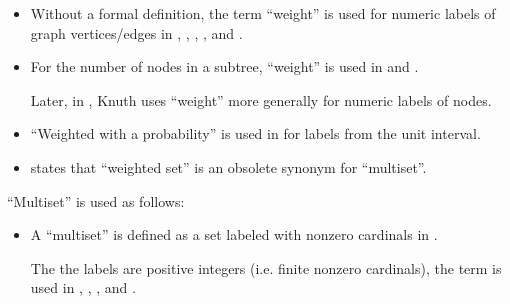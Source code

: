 \begin{remark}
\begin{thmenum}
\begin{itemize}
\begin{itemize}
        \item \( R \) is taken to be a \hyperref[def:ring/commutative]{commutative ring in}
        \cite[500]{Stanley2012EnumerativeCombinatoricsVol1}.

        \item \( R \) is taken to be an additively-idempotent \hyperref[def:semiring]{semiring} in
        \cite[def. 5.13]{БелоусовТкачёв2004ДискретнаяМатематика}.

        \item \( R \) is taken to be the field of real numbers in
        \cite[180]{Harary1969GraphTheory}.
      \end{itemize}

      \item Without a formal definition, the term \enquote{weight} is used for numeric labels of graph vertices/edges in
      \cite{Bollobás1998ModernGraphTheory},
      \cite{Rosen2019DiscreteMathematics},
      \cite{Erickson2019Algorithms},
      \cite[9]{GondranMinoux1984GraphsAndAlgorithms},
      \cite[62]{Зыков2004ТеорияГрафов} and
      \cite[12]{Мирчев2001Графи}.

      \item For the number of nodes in a subtree, \enquote{weight} is used in
      \cite[387]{Knuth1997ArtVol1} and
      \cite[35]{Harary1969GraphTheory}.

      Later, in \cite[417]{Knuth1997ArtVol1}, Knuth uses \enquote{weight} more generally for numeric labels of nodes.

      \item \enquote{Weighted with a probability} is used in \cite[298]{Diestel2017GraphTheory} for labels from the unit interval.

      \item \cite[37]{Blizard1988MultisetTheory} states that \enquote{weighted set} is an obsolete synonym for \enquote{multiset}.
    \end{itemize}

     \enquote{Multiset} is used as follows:
    \begin{itemize}
      \item A \enquote{multiset} is defined as a set labeled with nonzero cardinals in
      \cite[def. 1]{Hickman1980Multisets}.

      The the labels are positive integers (i.e. finite nonzero cardinals), the term is used in
      \cite[37]{Blizard1988MultisetTheory},
      \cite[18]{Stanley2012EnumerativeCombinatoricsVol1},
      \cite[309]{Barendregt1984LambdaCalculus},
      \cite[20]{Golan1999Semirings} and
      \cite[\S A.3.5]{Mimram2020ProgramEqualsProof}.


\end{itemize}
\end{thmenum}
\end{remark}
